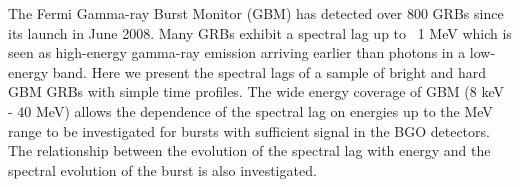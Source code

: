


\bigskip



\bigskip

\noindent The Fermi Gamma-ray Burst Monitor (GBM) has detected over 800 GRBs since its launch in June 2008. Many GRBs exhibit a spectral lag up to ~1 MeV which is seen as high-energy gamma-ray emission arriving earlier than photons in a low-energy band. Here we present the spectral lags of a sample of bright and hard GBM GRBs with simple time profiles. The wide energy coverage of GBM (8 keV - 40 MeV) allows the dependence of the spectral lag on energies up to the MeV range to be investigated for bursts with sufficient signal in the BGO detectors. The relationship between the evolution of the spectral lag with energy and the spectral evolution of the burst is also investigated.

